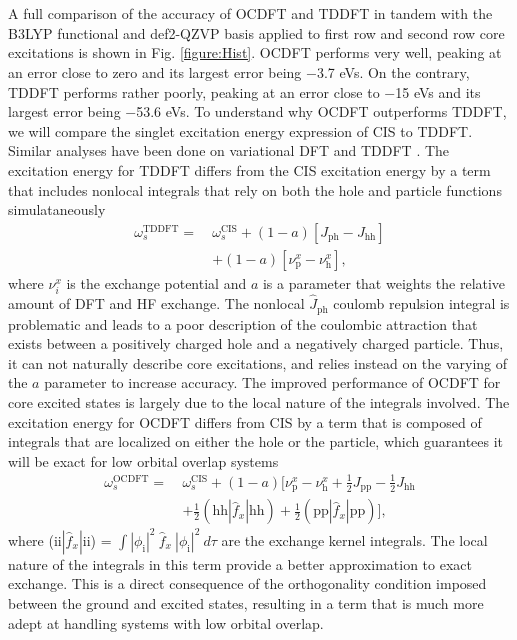 \documentclass[11.5pt]{article}
\begin{document}
\\ \\
A full comparison of the accuracy of OCDFT and TDDFT in tandem with the B3LYP functional and def2-QZVP basis applied to first row and second row core excitations is shown in Fig. \ref{figure:Hist}. OCDFT performs very well, peaking at an error close to zero and its largest error being $-$3.7 eVs. On the contrary, TDDFT performs rather poorly, peaking at an error close to $-$15 eVs and its largest error being $-$53.6 eVs. To understand why OCDFT outperforms TDDFT, we will compare the singlet excitation energy expression of CIS to TDDFT. Similar analyses have been done on variational DFT \cite{ziegler_implementation_2012} and TDDFT \cite{casida_charge-transfer_2000}. The excitation energy for TDDFT differs from the CIS excitation energy by a term that includes nonlocal integrals that rely on both the hole and particle functions simulataneously
\begin{align}
 \nonumber \omega^{\text{TDDFT}}_s = \ &\omega^{\text{CIS}}_s + (1 - a) [J_{\text{ph}} - J_{\text{hh}}] \\ &+ (1 - a) [\nu_{\text{p}}^x - \nu_{\text{h}}^x] ,
\end{align}
where $\nu_i^x$ is the exchange potential and $a$ is a parameter that weights the relative amount of DFT and HF exchange. The nonlocal $\hat{J}_{\text{ph}}$ coulomb repulsion integral is problematic and leads to a poor description of the coulombic attraction that exists between a positively charged hole and a negatively charged particle. Thus, it can not naturally describe core excitations, and relies instead on the varying of the $a$ parameter to increase accuracy. The improved performance of OCDFT for core excited states is largely due to the local nature of the integrals involved. The excitation energy for OCDFT differs from CIS by a term that is composed of integrals that are localized on either the hole or the particle, which guarantees it will be exact for low orbital overlap systems
\begin{align}
\nonumber \omega^{\text{OCDFT}}_s = \ &\omega^{\text{CIS}}_s + (1 - a) [\nu_{\text{p}}^x - \nu_{\text{h}}^x + \frac{1}{2} J_{\text{pp}} - \frac{1}{2} J_{\text{hh}} \\
&+ \frac{1}{2} (\text{hh}|\hat{f}_x|\text{hh}) +\frac{1}{2} (\text{pp}|\hat{f}_x|\text{pp})] ,
\end{align}
where (ii$|\hat{f}_x|$ii) = $\int |\phi_{\text{i}}|^2\ \hat{f}_x\  |\phi_{\text{i}}|^2 \ d\tau$ are the exchange kernel integrals. The local nature of the integrals in this term provide a better approximation to exact exchange. This is a direct consequence of the orthogonality condition imposed between the ground and excited states, resulting in a term that is much more adept at handling systems with low orbital overlap.
\end{document}
